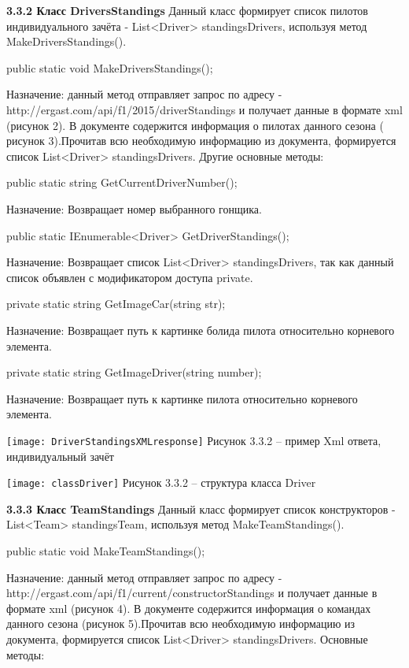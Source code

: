 \documentclass[14pt,a4paper]{extreport}
\begin{document}
	\textbf{3.3.2 Класс DriversStandings}
\flushleft\parindent=1cm Данный класс формирует список пилотов индивидуального зачёта - List<Driver> standingsDrivers, используя метод MakeDriversStandings().\par
  \par
public static void MakeDriversStandings();\par
Назначение: данный метод отправляет запрос по адресу - http://ergast.com/api/f1/2015/driverStandings и получает данные в формате xml (рисунок 2). В документе содержится информация о пилотах данного сезона ( рисунок 3).Прочитав всю необходимую информацию из документа, формируется список List<Driver> standingsDrivers. Другие основные методы:\par
 \par
public static string GetCurrentDriverNumber();\par
Назначение: Возвращает номер выбранного гонщика.\par
 \par
public static IEnumerable<Driver> GetDriverStandings();\par
Назначение: Возвращает список List<Driver> standingsDrivers, так как данный список объявлен с модификатором доступа private.\par
 \par
private static string GetImageCar(string str);\par
Назначение: Возвращает путь к картинке болида пилота относительно корневого элемента.\par
 \par
private static string GetImageDriver(string number);\par
Назначение: Возвращает путь к картинке пилота относительно корневого элемента.\par
	\texttt{[image: DriverStandingsXMLresponse]}   
           \center Рисунок 3.3.2 – пример Xml ответа, индивидуальный зачёт \par
           \texttt{[image: classDriver]}
           \center Рисунок 3.3.2 – структура класса Driver \par
	\textbf{3.3.3 Класс TeamStandings}
\flushleft\parindent=1cm Данный класс формирует список конструкторов - List<Team> standingsTeam, используя метод MakeTeamStandings().\par
 \par
public static void MakeTeamStandings();\par
Назначение: данный метод отправляет запрос по адресу - http://ergast.com/api/f1/current/constructorStandings и получает данные в формате xml (рисунок 4). В документе содержится информация о командах данного сезона (рисунок 5).Прочитав всю необходимую информацию из документа, формируется список List<Driver> standingsDrivers. Основные методы:\par
\end{document}
